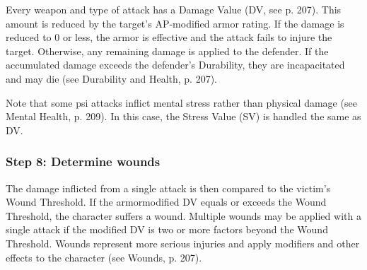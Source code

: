 Every weapon and type of attack has a Damage Value (DV, see p. 207). This amount is reduced by the target’s AP-modified armor rating. If the damage is reduced to 0 or less, the armor is effective and the attack fails to injure the target. Otherwise, any remaining damage is applied to the defender. If the accumulated damage exceeds the defender’s Durability, they are incapacitated and may die (see Durability and Health, p. 207).

Note that some psi attacks inflict mental stress rather than physical damage (see Mental Health, p. 209). In this case, the Stress Value (SV) is handled the same as DV.

\subsubsection{Step 8: Determine wounds}

The damage inflicted from a single attack is then compared to the victim’s Wound Threshold. If the armormodified DV equals or exceeds the Wound Threshold, the character suffers a wound. Multiple wounds may be applied with a single attack if the modified DV is two or more factors beyond the Wound Threshold. Wounds represent more serious injuries and apply modifiers and other effects to the character (see Wounds, p. 207).


